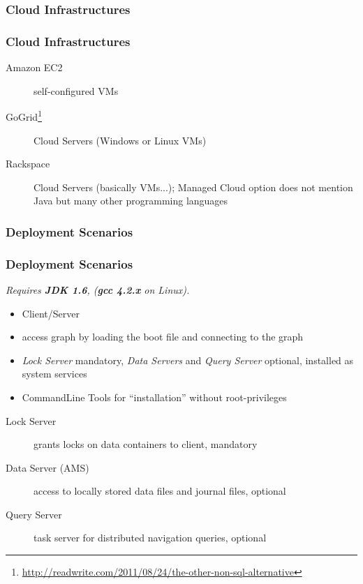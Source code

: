 

\subsubsection{Cloud Infrastructures} %
\label{ssub:supported_cloud_infrastructures}

\begin{frame}
\frametitle{Cloud Infrastructures}
\begin{description}
	\item[Amazon EC2]
		self-configured VMs
	\item[GoGrid\footnote{\url{http://readwrite.com/2011/08/24/the-other-non-sql-alternative}}]
		Cloud Servers (Windows or Linux VMs)
	\item[Rackspace]
		Cloud Servers (basically VMs...);
		Managed Cloud option does not mention Java but many other programming languages
\end{description}
\end{frame}

\subsubsection{Deployment Scenarios} %
\label{ssub:deployment_scenarios}

\begin{frame}
\frametitle{Deployment Scenarios}
\emph{Requires \textbf{JDK 1.6}, (\textbf{gcc 4.2.x} on Linux).}

\begin{itemize}
	\item Client/Server
	\item access graph by loading the boot file and connecting to the graph
	\item
		\emph{Lock Server} mandatory,
		\emph{Data Servers} and \emph{Query Server} optional,
		installed as system services

	\item CommandLine Tools for ``installation'' without root-privileges
\end{itemize}

\begin{description}
	\item[Lock Server] grants locks on data containers to client,
	mandatory
	\item[Data Server (AMS)] access to locally stored data files and journal files,
	optional
	\item[Query Server] task server for distributed navigation queries,
	optional
\end{description}
\end{frame}

